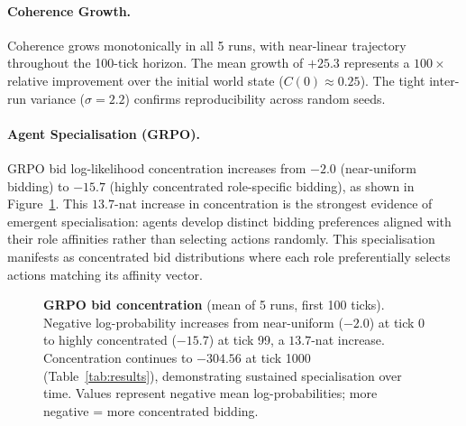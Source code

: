 \documentclass[11pt]{article}
\begin{document}
\paragraph{Coherence Growth.}
Coherence grows monotonically in all 5 runs, with near-linear
trajectory throughout the 100-tick horizon.
The mean growth of $+25.3$ represents a $100{\times}$ relative improvement
over the initial world state ($C(0) \approx 0.25$). The tight inter-run
variance ($\sigma = 2.2$) confirms reproducibility across random seeds.

\paragraph{Agent Specialisation (GRPO).}
GRPO bid log-likelihood concentration increases from $-2.0$ (near-uniform bidding) to
$-15.7$ (highly concentrated role-specific bidding), as shown in
Figure~\ref{fig:grpo}. This $13.7$-nat increase in concentration is the strongest evidence
of emergent specialisation: agents develop distinct bidding preferences
aligned with their role affinities rather than selecting actions randomly.
This specialisation manifests as concentrated bid distributions where each
role preferentially selects actions matching its affinity vector.

\begin{figure}[H]
\centering
{}
\caption{\textbf{GRPO bid concentration} (mean of 5 runs, first 100 ticks).
Negative log-probability increases from near-uniform ($-2.0$) at tick 0
to highly concentrated ($-15.7$) at tick 99, a $13.7$-nat increase.
Concentration continues to $-304.56$ at tick 1000 (Table~\ref{tab:results}),
demonstrating sustained specialisation over time. Values represent negative
mean log-probabilities; more negative = more concentrated bidding.}
\label{fig:grpo}
\end{figure}
\end{document}
